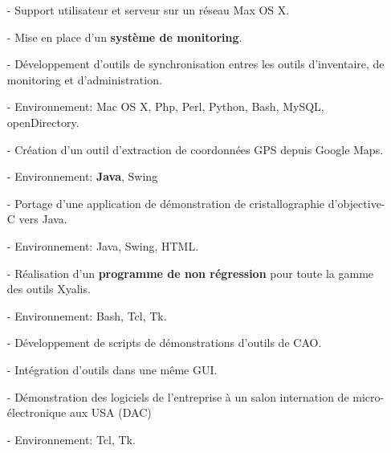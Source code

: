 \documentclass[10pt,a4paper]{moderncv}
\begin{document}
{
\begin{itemize}
\item[-]{Support utilisateur et serveur sur un réseau Max OS X.}
\item[-]{Mise en place d'un \textbf{système de monitoring}.}
\item[-]{Développement d'outils de synchronisation entres les outils d'inventaire, de monitoring et d'administration.}
\item[-]{Environnement: Mac OS X, Php, Perl, Python, Bash, MySQL, openDirectory.}
\end{itemize}
}

{
\begin{itemize}
\item[-]{Création d'un outil d'extraction de coordonnées GPS depuis Google Maps.}
\item[-]{Environnement: \textbf{Java}, Swing}
\end{itemize}
}

{
\begin{itemize}
\item[-]{Portage d'une application de démonstration de cristallographie d'objective-C vers Java.}
\item[-]{Environnement: Java, Swing, HTML.}
\end{itemize}
}

{
\begin{itemize}
\item[-]{Réalisation d'un \textbf {programme de non régression} pour toute la gamme des outils Xyalis.}
\item[-]{Environnement: Bash, Tcl, Tk.}
\end{itemize}
}

{
\begin{itemize}
\item[-]{Développement de scripts de démonstrations d'outils de CAO.}
\item[-]{Intégration d'outils dans une même GUI.}
\item[-]{Démonstration des logiciels de l'entreprise à un salon internation de micro-électronique aux USA (DAC)}
\item[-]{Environnement: Tcl, Tk.}
\end{itemize}
}
\end{document}

